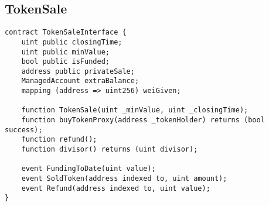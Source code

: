 \documentclass[9pt,oneside]{amsart}
\begin{document}
\subsection{TokenSale}
\begin{verbatim}
contract TokenSaleInterface {
    uint public closingTime;   
    uint public minValue;  
    bool public isFunded;   
    address public privateSale;
    ManagedAccount extraBalance;
    mapping (address => uint256) weiGiven;

    function TokenSale(uint _minValue, uint _closingTime);
    function buyTokenProxy(address _tokenHolder) returns (bool success);
    function refund();
    function divisor() returns (uint divisor);

    event FundingToDate(uint value);
    event SoldToken(address indexed to, uint amount);
    event Refund(address indexed to, uint value);
}
\end{verbatim}
\end{document}
